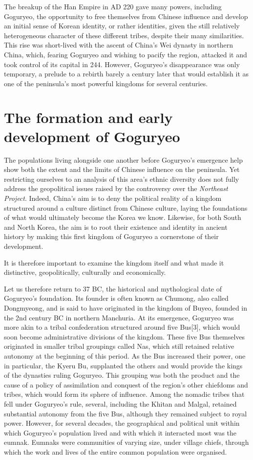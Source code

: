 \documentclass[11pt,a4paper]{article}
\begin{document}
The breakup of the Han Empire in AD 220 gave many powers, including Goguryeo, the opportunity to free themselves from Chinese influence and develop an initial sense of Korean identity, or rather identities, given the still relatively heterogeneous character of these different tribes, despite their many similarities. This rise was short-lived with the ascent of China's Wei dynasty in northern China, which, fearing Goguryeo and wishing to pacify the region, attacked it and took control of its capital in 244. However, Goguryeo's disappearance was only temporary, a prelude to a rebirth barely a century later that would establish it as one of the peninsula's most powerful kingdoms for several centuries.

\section{The formation and early development of Goguryeo}

The populations living alongside one another before Goguryeo’s emergence help show both the extent and the limits of Chinese influence on the peninsula. Yet restricting ourselves to an analysis of this area's ethnic diversity does not fully address the geopolitical issues raised by the controversy over the \emph{Northeast Project}. Indeed, China's aim is to deny the political reality of a kingdom structured around a culture distinct from Chinese culture, laying the foundations of what would ultimately become the Korea we know. Likewise, for both South and North Korea, the aim is to root their existence and identity in ancient history by making this first kingdom of Goguryeo a cornerstone of their development.

It is therefore important to examine the kingdom itself and what made it distinctive, geopolitically, culturally and economically.

Let us therefore return to 37 BC, the historical and mythological date of Goguryeo's foundation. Its founder is often known as Chumong, also called Dongmyeong, and is said to have originated in the kingdom of Buyeo, founded in the 2nd century BC in northern Manchuria. At its emergence, Goguryeo was more akin to a tribal confederation structured around five Bus{[}3{]}, which would soon become administrative divisions of the kingdom. These five Bus themselves originated in smaller tribal groupings called Nas, which still retained relative autonomy at the beginning of this period. As the Bus increased their power, one in particular, the Kyeru Bu, supplanted the others and would provide the kings of the dynasties ruling Goguryeo. This grouping was both the product and the cause of a policy of assimilation and conquest of the region's other chiefdoms and tribes, which would form its sphere of influence. Among the nomadic tribes that fell under Goguryeo's rule, several, including the Khitan and Malgal, retained substantial autonomy from the five Bus, although they remained subject to royal power. However, for several decades, the geographical and political unit within which Goguryeo's population lived and with which it interacted most was the eumnak. Eumnaks were communities of varying size, under village chiefs, through which the work and lives of the entire common population were organised.
\end{document}
